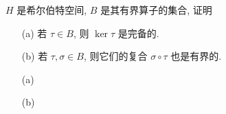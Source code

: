 \documentclass{assignment}
\begin{document}
\begin{prob}
    $H$ 是希尔伯特空间, $B$ 是其有界算子的集合, 证明
    \begin{itemize}
        \item[(a)] 若 $\tau\in B$, 则 $\ker\tau$ 是完备的.
        \item[(b)] 若 $\tau,\sigma\in B$, 则它们的复合 $\sigma\circ\tau$ 也是有界的.
    \end{itemize}
\end{prob}
\begin{pf}
    \begin{itemize}
        \item[(a)] 
        \item[(b)] 
    \end{itemize}
\end{pf}
\end{document}
